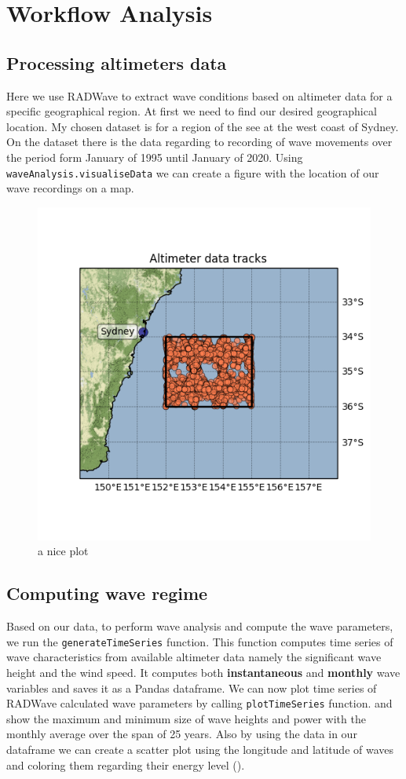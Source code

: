 \documentclass[12pt]{article}
\begin{document}
\newpage
\section{Workflow Analysis}
\subsection{Processing altimeters data}
Here we use RADWave to extract wave conditions based on altimeter data for a specific geographical region. At first we need to find our desired geographical location. My chosen dataset is for a region of the see at the west coast of Sydney. On the dataset there is the data regarding to recording of wave movements over the period form January of 1995 until January of 2020. Using \texttt{waveAnalysis.visualiseData} we can create a figure with the location of our wave recordings on a map.

\begin{figure}[h]
    \centering
    \includegraphics[width=8 cm]{altimeterdata.png}
    \caption{a nice plot}
    \label{fig:fig1}
\end{figure}

\subsection{Computing wave regime}
Based on our data, to perform wave analysis and compute the wave parameters, we run the \texttt{generateTimeSeries} function. This function computes time series of wave characteristics from available altimeter data namely the significant wave height and the wind speed. It computes both \textbf{instantaneous} and \textbf{monthly} wave variables and saves it as a Pandas dataframe. We can now plot time series of RADWave calculated wave parameters by calling \texttt{plotTimeSeries} function.
 and  show the maximum and minimum size of wave heights and power with the monthly average over the span of 25 years. Also by using the data in our dataframe we can create a scatter plot using the longitude and latitude of waves and coloring them regarding their energy level ().
\newpage
\end{document}
